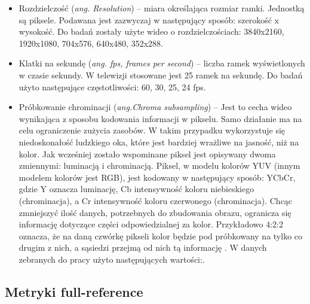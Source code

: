 \begin{itemize}[label=$\bullet$]
\item Rozdzielczość ({\em ang.  Resolution}) -- miara określająca rozmiar ramki. Jednostką są piksele. Podawana jest zazwyczaj w następujący sposób: szerokość x wysokość. Do badań zostały użyte wideo o rozdzielczościach: 3840x2160, 1920x1080, 704x576, 640x480, 352x288. 
\item Klatki na sekundę ({\em ang. fps, frames per second}) -- liczba ramek wyświetlonych w czasie sekundy. W telewizji stosowane jest 25 ramek na sekundę. Do badań użyto następujące częstotliwości: 60, 30, 25, 24 fps.
\item Próbkowanie chrominacji  ({\em ang.Chroma subsampling}) -- Jest to cecha  wideo wynikająca z sposobu kodowania  informacji w pikselu.  Samo działanie ma na celu  ograniczenie zużycia zasobów.  W takim przypadku wykorzystuje się  niedoskonałość ludzkiego oka, które jest bardziej wrażliwe na jasność, niż na kolor. Jak wcześniej zostało wspominane piksel jest opisywany dwoma zmiennymi: luminacją i chrominacją. Piksel, w modelu kolorów YUV (innym modelem kolorów jest RGB),  jest  kodowany w następujący sposób: YCbCr, gdzie Y oznacza luminację, Cb intensywność koloru niebieskiego (chrominacja), a Cr intensywność koloru czerwonego (chrominacja). Chcąc zmniejszyć ilość danych, potrzebnych do zbudowania obrazu, ogranicza się informację dotyczące części odpowiedzialnej za kolor. Przykładowo 4:2:2 oznacza, że na daną czwórkę pikseli kolor będzie pod próbkowany na tylko co drugim z nich, a sąsiedzi przejmą od nich tą informację  \cite{chroma_sampling}. W danych zebranych do pracy użyto następujących wartości:.
\end{itemize}


\subsection{Metryki full-reference}

